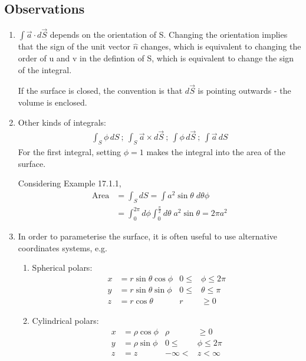 \documentclass[a4paper, 11pt, normalem]{report}
\begin{document}
\subsection{Observations}
\begin{enumerate}
    \item $\int \vec{a} \cdot d\vec{S}$ depends on the orientation of S. Changing the orientation implies that the sign of the unit vector $\hat{n}$ changes, which is equivalent to changing the order of u and v in the defintion of S, which is equivalent to change the sign of the integral.

    If the surface is closed, the convention is that $d\vec{S}$ is pointing outwards - the volume is enclosed.
    \item Other kinds of integrals:
            \begin{align*}
                \int_S \phi\,dS ~;~ \int_S \vec{a} \times d\vec{S} ~;~ \int \phi\,d\vec{S} ~;~ \int \vec{a}\,dS
            \end{align*}
            For the first integral, setting $\phi = 1$ makes the integral into the area of the surface.

            Considering Example 17.1.1,
            \begin{align*}
                \text{Area} &= \int_S dS = \int a^2 \sin\theta\; d\theta\phi \\
                &= \int_{0}^{2\pi} d\phi \int_{0}^{\frac{\pi}{2}} d\theta\; a^2\sin\theta = 2\pi a^2
            \end{align*}
    \item In order to parameterise the surface, it is often useful to use alternative coordinates systems, e.g.
            \begin{enumerate}
                \item Spherical polars:
                    \begin{align*}
                        x &= r\sin\theta\cos\phi & 0 \leq &\phi \leq 2\pi \\
                        y &= r\sin\theta\sin\phi & 0 \leq &\theta \leq \pi \\
                        z &= r\cos\theta & r &\geq 0
                    \end{align*}
                \item Cylindrical polars:
                    \begin{align*}
                        x &= \rho\cos\phi & \rho &\geq 0 \\
                        y &= \rho\sin\phi & 0 \leq &\phi \leq 2\pi \\
                        z &= z & -\infty < &z < \infty
                    \end{align*}
            \end{enumerate}
\end{enumerate}
\end{document}
